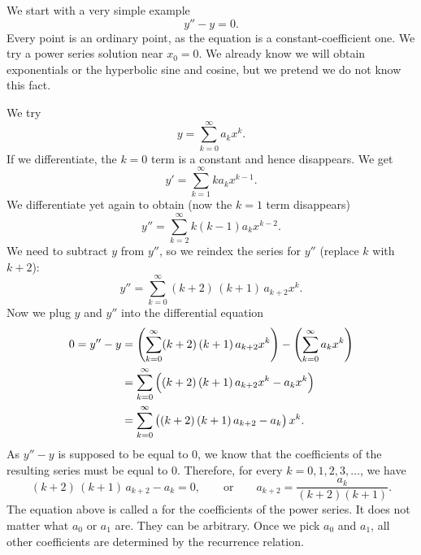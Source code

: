 \begin{example}
We start with a very simple example
\begin{equation*}
y'' - y = 0 .
\end{equation*}
Every point is an ordinary
point, as the equation is a constant-coefficient one.
We try a power series solution near $x_0 = 0$.
We already know
we will obtain exponentials or the hyperbolic sine and cosine,
but we pretend we do not know this fact.

We try
\begin{equation*}
y = \sum_{k=0}^\infty a_k x^k .
\end{equation*}
If we differentiate, the $k=0$ term is a constant and hence disappears.
We get
\begin{equation*}
y' = \sum_{k=1}^\infty k a_k x^{k-1} .
\end{equation*}
We differentiate yet again to obtain (now the $k=1$ term disappears)
\begin{equation*}
y'' = \sum_{k=2}^\infty k(k-1) a_k x^{k-2} .
\end{equation*}
We need to subtract $y$ from $y''$, so 
we reindex the series for $y''$ (replace $k$ with $k+2$):
\begin{equation*}
y'' = \sum_{k=0}^\infty (k+2)\,(k+1) \, a_{k+2} x^k .
\end{equation*}
Now we plug $y$ and $y''$ into the differential equation
\begin{equation*}
\begin{split}
0 = y''-y & = 
\Biggl( \sum_{k=0}^\infty (k+2)\,(k+1) \, a_{k+2} x^k  \Biggr)
-
\Biggl( \sum_{k=0}^\infty a_k x^k \Biggr)
\\
& =
\sum_{k=0}^\infty \,\Bigl( (k+2)\,(k+1) \, a_{k+2} x^k 
-
a_k x^k \Bigr)
\\
& =
\sum_{k=0}^\infty \,\bigl( (k+2)\,(k+1) \,a_{k+2} - a_k \bigr) \, x^k  .
\end{split}
\end{equation*}
As $y'' - y$ is supposed to be equal to 0, we know that the
coefficients of the resulting series must be equal to 0.  Therefore,
for every $k=0,1,2,3,\ldots$, we have
\begin{equation*}
(k+2)\,(k+1) \,a_{k+2} - a_k = 0 ,
\qquad
\text{or}
\qquad
a_{k+2} = \frac{a_k}{(k+2)(k+1)} .
\end{equation*}
The equation above is called a \emph{}
for the coefficients of the power series.
It does not matter what $a_0$ or $a_1$ are.  They can be arbitrary.
Once we pick $a_0$ and $a_1$, all other coefficients are
determined by the recurrence relation.


\end{example}
